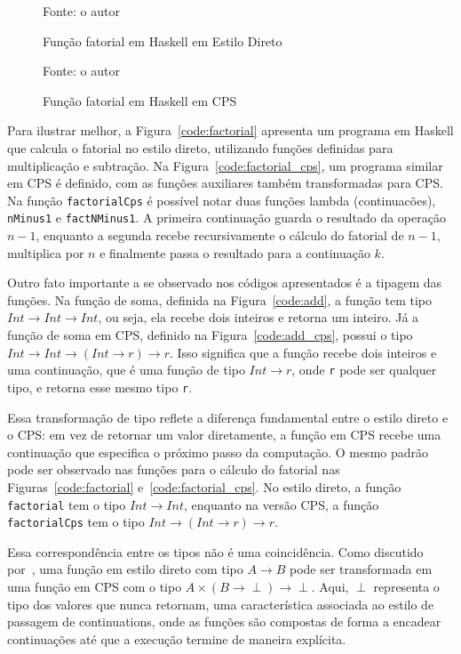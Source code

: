 \begin{figure}
  \caption{Função fatorial em Haskell em Estilo Direto}
  \small{Fonte: o autor}
  
\end{figure}

\begin{figure}
  \caption{Função fatorial em Haskell em CPS}
  \small{Fonte: o autor}
  
\end{figure}

Para ilustrar melhor, a Figura~\ref{code:factorial} apresenta um programa em Haskell que calcula o fatorial no estilo direto, utilizando funções definidas para multiplicação e subtração.
Na Figura~\ref{code:factorial_cps}, um programa similar em CPS é definido, com as funções auxiliares também transformadas para CPS\@.
Na função \texttt{factorialCps} é possível notar duas funções lambda (continuacões), \texttt{nMinus1} e \texttt{factNMinus1}.
A primeira continuação guarda o resultado da operação $n - 1$, enquanto a segunda recebe recursivamente o cálculo do fatorial de $n - 1$, multiplica por $n$ e finalmente passa o resultado para a continuação $k$.

Outro fato importante a se observado nos códigos apresentados é a tipagem das funções.
Na função de soma, definida na Figura~\ref{code:add}, a função tem tipo $Int \rightarrow Int \rightarrow Int$, ou seja, ela recebe dois inteiros e retorna um inteiro.
Já a função de soma em CPS, definido na Figura~\ref{code:add_cps}, possui o tipo $Int \rightarrow Int \rightarrow (Int \rightarrow r) \rightarrow r$. Isso significa que a função recebe dois inteiros e uma continuação, que é uma função de tipo $Int \rightarrow r$, onde \texttt{r} pode ser qualquer tipo, e retorna esse mesmo tipo \texttt{r}.

Essa transformação de tipo reflete a diferença fundamental entre o estilo direto e o CPS\@: em vez de retornar um valor diretamente, a função em CPS recebe uma continuação que especifica o próximo passo da computação.
O mesmo padrão pode ser observado nas funções para o cálculo do fatorial nas Figuras~\ref{code:factorial} e~\ref{code:factorial_cps}.
No estilo direto, a função \texttt{factorial} tem o tipo $Int \rightarrow Int$, enquanto na versão CPS, a função \texttt{factorialCps} tem o tipo $Int \rightarrow (Int \rightarrow r) \rightarrow r$.

Essa correspondência entre os tipos não é uma coincidência.
Como discutido por~\cite{TORRENS2019}, uma função em estilo direto com tipo $A \rightarrow B$ pode ser transformada em uma função em CPS com o tipo $A \times (B \rightarrow \perp) \rightarrow \perp$.
Aqui, $\perp$ representa o tipo dos valores que nunca retornam, uma característica associada ao estilo de passagem de continuations, onde as funções são compostas de forma a encadear continuações até que a execução termine de maneira explícita.
